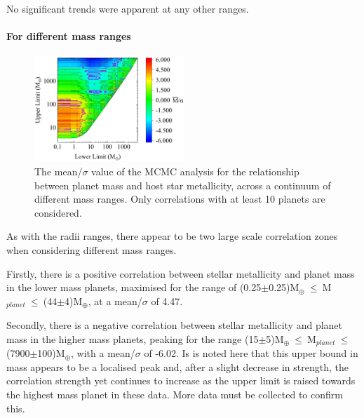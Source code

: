 \documentclass[a4paper,twocolumn,12pt]{article}
\begin{document}
No significant trends were apparent at any other ranges.




\paragraph{For different mass ranges}

\begin{figure}[h!]
    \centering
    \includegraphics[width=0.5\textwidth]{Graphs/FeH vs Mass correlations - Mass ranges.pdf}
    \caption{The mean/$\sigma$ value of the MCMC analysis for the relationship between planet mass and host star metallicity, across a continuum of different mass ranges. Only correlations with at least 10 planets are considered.}
    \label{figure: Fe/H vs Mass correlations - Mass ranges}
\end{figure}

As with the radii ranges, there appear to be two large scale correlation zones when considering different mass ranges.

Firstly, there is a positive correlation between stellar metallicity and planet mass in the lower mass planets, maximised for the range of (0.25$\pm$0.25)M$_{\oplus}~\leq~$M$_{planet}~\leq~$(44$\pm$4)M$_{\oplus}$, at a mean/$\sigma$ of 4.47.

Secondly, there is a negative correlation between stellar metallicity and planet mass in the higher mass planets, peaking for the range (15$\pm$5)M$_{\oplus}~\leq~$M$_{planet}~\leq~$(7900$\pm$100)M$_{\oplus}$, with a mean/$\sigma$ of -6.02. Is is noted here that this upper bound in mass appears to be a localised peak and, after a slight decrease in strength, the correlation strength yet continues to increase as the upper limit is raised towards the highest mass planet in these data. More data must be collected to confirm this.
\end{document}
